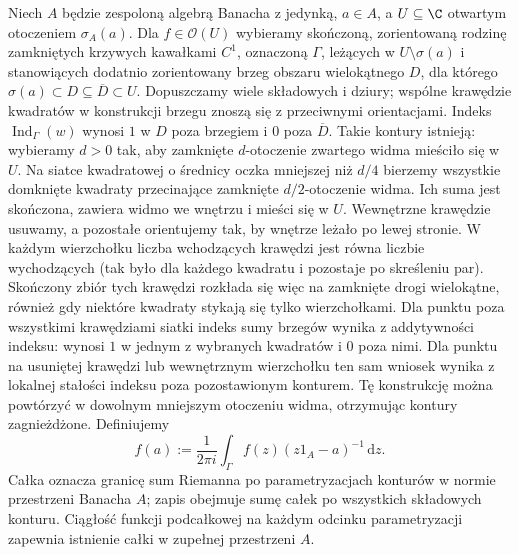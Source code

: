 \begin{definicja}
\label{def:holomorphic-calculus31}
Niech $A$ będzie zespoloną algebrą Banacha z jedynką, $a\in A$,
a $U\subseteq\C$ otwartym otoczeniem $\sigma_A(a)$.
Dla $f\in\mathcal O(U)$ wybieramy skończoną, zorientowaną
rodzinę zamkniętych krzywych kawałkami $C^1$, oznaczoną $\Gamma$,
leżących w $U\setminus\sigma(a)$ i stanowiących dodatnio
zorientowany brzeg obszaru wielokątnego $D$, dla którego
$\sigma(a)\subset D\subseteq\overline D\subset U$.
Dopuszczamy wiele składowych i dziury; wspólne krawędzie
kwadratów w konstrukcji brzegu znoszą się z przeciwnymi
orientacjami. Indeks $\operatorname{Ind}_\Gamma(w)$
wynosi $1$ w $D$ poza brzegiem i $0$ poza $\overline D$.
Takie kontury istnieją: wybieramy $d>0$ tak, aby zamknięte
$d$-otoczenie zwartego widma mieściło się w $U$.
Na siatce kwadratowej o średnicy oczka mniejszej niż
$d/4$ bierzemy wszystkie domknięte kwadraty przecinające
zamknięte $d/2$-otoczenie widma. Ich suma jest skończona,
zawiera widmo we wnętrzu i mieści się w $U$.
Wewnętrzne krawędzie usuwamy, a pozostałe orientujemy
tak, by wnętrze leżało po lewej stronie. W każdym
wierzchołku liczba wchodzących krawędzi jest równa
liczbie wychodzących (tak było dla każdego kwadratu
i pozostaje po skreśleniu par). Skończony zbiór tych
krawędzi rozkłada się więc na zamknięte drogi wielokątne,
również gdy niektóre kwadraty stykają się tylko wierzchołkami.
Dla punktu poza wszystkimi krawędziami siatki indeks
sumy brzegów wynika z addytywności indeksu: wynosi $1$
w jednym z wybranych kwadratów i $0$ poza nimi.
Dla punktu na usuniętej krawędzi lub wewnętrznym wierzchołku
ten sam wniosek wynika z lokalnej stałości indeksu poza
pozostawionym konturem.
Tę konstrukcję można powtórzyć w dowolnym mniejszym
otoczeniu widma, otrzymując kontury zagnieżdżone.
Definiujemy
\[
 f(a):=\frac{1}{2\pi i}\int_\Gamma f(z)(z1_A-a)^{-1}\,\mathrm dz.
\]
Całka oznacza granicę sum Riemanna po parametryzacjach konturów
w normie przestrzeni Banacha $A$; zapis obejmuje sumę całek
po wszystkich składowych konturu. Ciągłość funkcji podcałkowej na każdym odcinku parametryzacji
zapewnia istnienie całki w zupełnej przestrzeni $A$.
\end{definicja}

